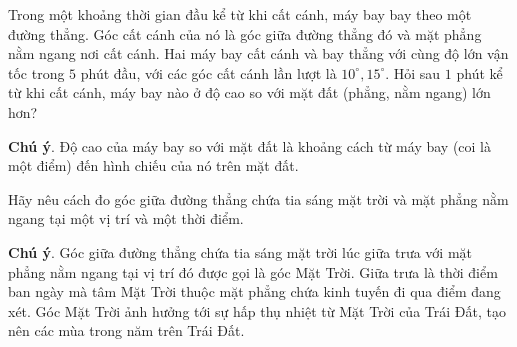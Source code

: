 \begin{bt}%
	Trong một khoảng thời gian đầu kể từ khi cất cánh, máy bay bay theo một đường thẳng. Góc cất cánh của nó là góc giữa đường thẳng đó và mặt phẳng nằm ngang nơi cất cánh. Hai máy bay cất cánh và bay thẳng với cùng độ lớn vận tốc trong $5$ phút đầu, với các góc cất cánh lần lượt là $10^\circ, 15^\circ$. Hỏi sau $ 1 $ phút kể từ khi cất cánh, máy bay nào ở độ cao so với mặt đất (phẳng, nằm ngang) lớn hơn?\\
	\begin{note}
		\textbf{Chú ý}. Độ cao của máy bay so với mặt đất là khoảng cách từ máy bay (coi là một điểm) đến hình chiếu của nó trên mặt đất.
	\end{note}
\end{bt}
\begin{bt}%
	Hãy nêu cách đo góc giữa đường thẳng chứa tia sáng mặt trời và mặt phẳng nằm ngang tại một vị trí và một thời điểm.
	\begin{note}
		\textbf{Chú ý}. Góc giữa đường thẳng chứa tia sáng mặt trời lúc giữa trưa với mặt phẳng nằm ngang tại vị trí đó được gọi là góc Mặt Trời. Giữa trưa là thời điểm ban ngày mà tâm Mặt Trời thuộc mặt phẳng chứa kinh tuyến đi qua điểm đang xét. Góc Mặt Trời ảnh hưởng tới sự hấp thụ nhiệt từ Mặt Trời của Trái Đất, tạo nên các mùa trong năm trên Trái Đất.
	\end{note}
\end{bt}
